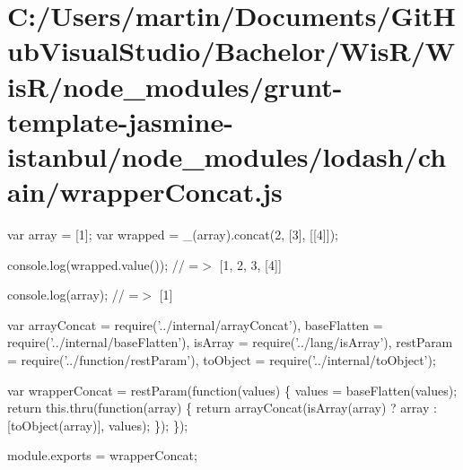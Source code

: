 \hypertarget{_c_1_2_users_2martin_2_documents_2_git_hub_visual_studio_2_bachelor_2_wis_r_2_wis_r_2node_modulef68b0720fe4f447bdb7b367f1da08d65}{}\section{C\+:/\+Users/martin/\+Documents/\+Git\+Hub\+Visual\+Studio/\+Bachelor/\+Wis\+R/\+Wis\+R/node\+\_\+modules/grunt-\/template-\/jasmine-\/istanbul/node\+\_\+modules/lodash/chain/wrapper\+Concat.\+js}
var array = \mbox{[}1\mbox{]}; var wrapped = \+\_\+(array).concat(2, \mbox{[}3\mbox{]}, \mbox{[}\mbox{[}4\mbox{]}\mbox{]});

console.\+log(wrapped.\+value()); // =$>$ \mbox{[}1, 2, 3, \mbox{[}4\mbox{]}\mbox{]}

console.\+log(array); // =$>$ \mbox{[}1\mbox{]}


\begin{DoxyCodeInclude}
var arrayConcat = require(\textcolor{stringliteral}{'../internal/arrayConcat'}),
    baseFlatten = require(\textcolor{stringliteral}{'../internal/baseFlatten'}),
    isArray = require(\textcolor{stringliteral}{'../lang/isArray'}),
    restParam = require(\textcolor{stringliteral}{'../function/restParam'}),
    toObject = require(\textcolor{stringliteral}{'../internal/toObject'});

var wrapperConcat = restParam(\textcolor{keyword}{function}(values) \{
  values = baseFlatten(values);
  \textcolor{keywordflow}{return} this.thru(\textcolor{keyword}{function}(array) \{
    \textcolor{keywordflow}{return} arrayConcat(isArray(array) ? array : [toObject(array)], values);
  \});
\});

module.exports = wrapperConcat;
\end{DoxyCodeInclude}
 